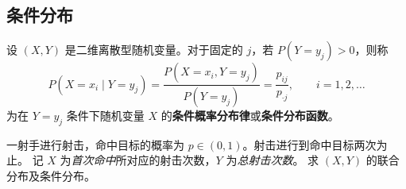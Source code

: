 














\subsection{条件分布}
\begin{definition}[离散型随机变量的条件分布]
设 $(X,Y)$ 是二维离散型随机变量。对于固定的 $j$，若 $P(Y=y_j)>0$，则称
\[
P(X=x_i\mid Y=y_j)
=\frac{P(X=x_i,Y=y_j)}{P(Y=y_j)}
=\frac{p_{ij}}{p_{\cdot j}},\qquad i=1,2,\dots
\]
为在 $Y=y_j$ 条件下随机变量 $X$ 的\textbf{条件概率分布律}或\textbf{条件分布函数}。
\end{definition}
\begin{example}
一射手进行射击，命中目标的概率为 $p\in(0,1)$。射击进行到命中目标两次为止。
记 $X$ 为\emph{首次命中}所对应的射击次数，$Y$ 为\emph{总射击次数}。
求 $(X,Y)$ 的联合分布及条件分布。
\end{example}


